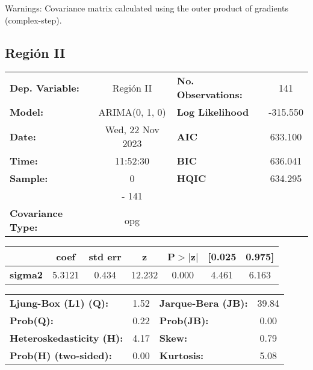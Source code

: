 \documentclass{article}%
\begin{document}
Warnings: \newline
 [1] Covariance matrix calculated using the outer product of gradients (complex-step).%
\subsection*{Región II}%
\begin{center}
\begin{tabular}{lclc}
\toprule
\textbf{Dep. Variable:}          &    Región II     & \textbf{  No. Observations:  } &    141      \\
\textbf{Model:}                  &  ARIMA(0, 1, 0)  & \textbf{  Log Likelihood     } &  -315.550   \\
\textbf{Date:}                   & Wed, 22 Nov 2023 & \textbf{  AIC                } &  633.100    \\
\textbf{Time:}                   &     11:52:30     & \textbf{  BIC                } &  636.041    \\
\textbf{Sample:}                 &        0         & \textbf{  HQIC               } &  634.295    \\
\textbf{}                        &       - 141      & \textbf{                     } &             \\
\textbf{Covariance Type:}        &       opg        & \textbf{                     } &             \\
\bottomrule
\end{tabular}
\begin{tabular}{lcccccc}
                & \textbf{coef} & \textbf{std err} & \textbf{z} & \textbf{P$> |$z$|$} & \textbf{[0.025} & \textbf{0.975]}  \\
\midrule
\textbf{sigma2} &       5.3121  &        0.434     &    12.232  &         0.000        &        4.461    &        6.163     \\
\bottomrule
\end{tabular}
\begin{tabular}{lclc}
\textbf{Ljung-Box (L1) (Q):}     & 1.52 & \textbf{  Jarque-Bera (JB):  } & 39.84  \\
\textbf{Prob(Q):}                & 0.22 & \textbf{  Prob(JB):          } &  0.00  \\
\textbf{Heteroskedasticity (H):} & 4.17 & \textbf{  Skew:              } &  0.79  \\
\textbf{Prob(H) (two-sided):}    & 0.00 & \textbf{  Kurtosis:          } &  5.08  \\
\bottomrule
\end{tabular}
\end{center}
\end{document}
